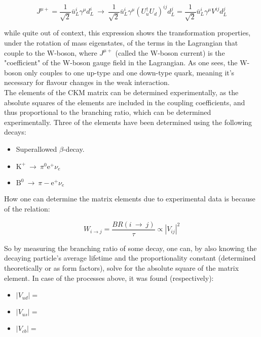 \documentclass[11pt,a4paper]{article}
\begin{document}
\begin{equation}
J^{\mu+} = \frac{1}{\sqrt{2}}\bar{u}_L^i\gamma^\mu d_L^i \:\rightarrow\: \frac{1}{\sqrt{2}}\bar{u}_L^i\gamma^\mu (U_u^\dagger U_d)^{ij}d_L^j = 
\frac{1}{\sqrt{2}}\bar{u}_L^i\gamma^\mu V^{ij}d_L^j
\end{equation}

while quite out of context, this expression shows the transformation properties, under the rotation of mass eigenstates, of the terms in the Lagrangian that couple to the W-boson, where $J^{\mu+}$ (called the W-boson current) is the "coefficient" of the W-boson gauge field in the Lagrangian. As one sees, the W-boson only couples to one up-type and one down-type quark, meaning it's necessary for flavour changes in the weak interaction.\\

The elements of the CKM matrix can be determined experimentally, as the absolute squares of the elements are included in the coupling coefficients, and thus proportional to the branching ratio, which can be determined experimentally. Three of the elements have been determined using the following decays:

\begin{itemize}\centering
	\item Superallowed $\beta$-decay.
	\item $\text{K}^+ \:\rightarrow\: \pi^0\text{e}^+\nu_e$\\
	\item $\text{B}^0 \:\rightarrow\: \pi-\text{e}^+\nu_e$
\end{itemize}

How one can determine the matrix elements due to experimental data is because of the relation:

\begin{equation}
W_{i\rightarrow j} = \frac{BR(i \:\rightarrow\: j)}{\tau} \propto |V_{ij}|^2
\end{equation}

So by measuring the branching ratio of some decay, one can, by also knowing the decaying particle's average lifetime and the proportionality constant (determined theoretically or as form factors), solve for the absolute square of the matrix element. In case of the processes above, it was found (respectively):

\begin{itemize}\centering
	\item $|V_{ud}| = $
	\item $|V_{us}| = $
	\item $|V_{cb}| = $
\end{itemize}
\end{document}
